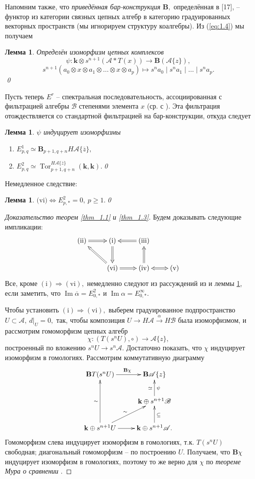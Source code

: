 \documentclass[10pt,a4paper]{article}
\DeclareMathOperator{\Tor}{Tor}
\DeclareMathOperator{\Img}{Im}
\def\A{\mathscr{A}}
\def\B{\mathscr{B}}
\def\k{\mathbf{k}}
\newtheorem{lmm}[thm]{Лемма}
\theoremstyle{definition}
\begin{document}
Напомним также, что \emph{приведённая бар-конструкция} $\mathbf{B},$ определённая в [17], -- функтор из категории связных цепных алгебр в категорию градуированных векторных пространств (мы игнорируем структуру коалгебры). Из (\ref{eq:1.4}) мы получаем
\begin{lmm}\label{lmm_1.5}
Определён изоморфизм цепных комплексов
$$\psi:\k\otimes s^{n+1}\left(\A\ast T(x)\right)\to \mathbf{B}(\A\{z\}),$$ $$s^{n+1}(a_0\otimes x\otimes a_1\otimes\dots\otimes x\otimes a_p)\mapsto s^n a_0\mid s^n a_1\mid\dots\mid s^n a_p.$$
\qed
\end{lmm}
Пусть теперь $E^r$ -- спектральная последовательность, ассоциированная с фильтрацией алгебры $\B$ степенями элемента $x$ (ср. с \cite[\S 1]{15}). Эта фильтрация отождествляется со стандартной фильтрацией на бар-конструкции, откуда следует
\begin{lmm}\label{lmm_1.6} $\psi$ индуцирует изоморфизмы
\begin{enumerate}
\item[(a)] $E_{p,q}^1\simeq \mathbf{B}_{p+1,q+n} H\A\{\overline{z}\},$
\item[(b)] $E_{p,q}^2\simeq\Tor_{p+1,q+n}^{H\A\{\overline{z}\}}(\k,\k).$\qed
\end{enumerate}
\end{lmm}
Немедленное следствие:
\begin{lmm}\label{lmm_1.7}
$\mathrm{(vi})\Leftrightarrow E_{p,*}^2=0,~p\ge 1.$\qed
\end{lmm}
\begin{proof}[Доказательство теорем \ref{thm_1.1} и \ref{thm_1.3}]
Будем доказывать следующие импликации:
$$\xymatrix{
\mathrm{(ii)}\ar@{=>}[r] & \mathrm{(i)}\ar@{=>}[d] & \mathrm{(iii)}\ar@{=>}[l] & \\
     & \mathrm{(vi)}\ar@{=>}[r]\ar@{=>}[lu] & \mathrm{(iv)}\ar@{=>}[u]\ar@{<=>}[r] & \mathrm{(v)}}$$ Все, кроме $\mathrm{(i)}\Rightarrow \mathrm{(vi)},$ немедленно следуют из рассуждений из \cite[\S 2]{15} и леммы \ref{lmm_1.7}, если заметить, что $\Img\overline{\alpha}=E_{0,*}^2$ и $\Img\alpha =E_{0,*}^\infty.$
     
Чтобы установить $\mathrm{(i)}\Rightarrow \mathrm{(vi)},$ выберем градуированное подпространство $U\subset \A,~d|_U=0,$ так, чтобы композиция $U\to H\A\overset{\alpha}{\longrightarrow} H\B$ была изоморфизмом, и рассмотрим гомоморфизм цепных алгебр
     $$\chi:(T(s^nU),\circ)\to\A\{z\},$$ построенный по вложению $s^nU\to s^n\A.$ Достаточно показать, что $\chi$ индуцирует изоморфизм в гомологиях. Рассмотрим коммутативную диаграмму
$$\xymatrix{
\mathbf{B}T(s^nU)\ar[r]^{\mathbf{B}\chi} & \mathbf{B}\A\{z\}\\
& \k\oplus s^{n+1}\B\ar[u]_\psi^\simeq\\
\k\oplus s^{n+1} U\ar[uu]^\sim\ar[ur]^\sim\ar[r] & \k\oplus s^{n+1}\A.\ar[u]_\subseteq}$$ 
Гомоморфизм слева индуцирует изоморфизм в гомологиях, т.к. $T(s^nU)$ свободная; диагональный гомоморфизм -- по построению $U.$ Получаем, что $\mathbf{B}\chi$ индуцирует изоморфизм в гомологиях, поэтому то же верно для $\chi$ по \emph{теореме Мура о сравнении} \cite{17}.
\end{proof}
\end{document}
